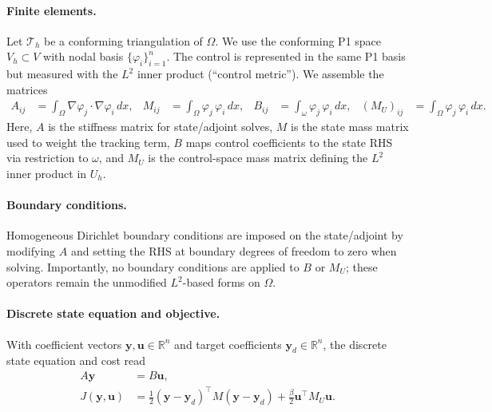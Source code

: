 \documentclass[11pt,a4paper]{article}
\begin{document}
\paragraph{Finite elements.} 
Let \(\mathcal{T}_h\) be a conforming triangulation of \(\Omega\). We use the conforming P1 space \(V_h\subset V\) with nodal basis \(\{\varphi_i\}_{i=1}^{n}\). The control is represented in the same P1 basis but measured with the \(L^2\) inner product (``control metric''). We assemble the matrices
\begin{align}
  A_{ij} &= \int_{\Omega} \nabla \varphi_j\cdot\nabla \varphi_i\, dx, &
  M_{ij} &= \int_{\Omega} \varphi_j\, \varphi_i\, dx, &
  B_{ij} &= \int_{\omega} \varphi_j\, \varphi_i\, dx, &
  (M_U)_{ij} &= \int_{\Omega} \varphi_j\, \varphi_i\, dx.
\end{align}
Here, \(A\) is the stiffness matrix for state/adjoint solves, \(M\) is the state mass matrix used to weight the tracking term, $B$ maps control coefficients to the state RHS via restriction to \(\omega\), and $M_U$ is the control-space mass matrix defining the \(L^2\) inner product in \(U_h\).

\paragraph{Boundary conditions.} 
Homogeneous Dirichlet boundary conditions are imposed on the state/adjoint by modifying \(A\) and setting the RHS at boundary degrees of freedom to zero when solving. Importantly, no boundary conditions are applied to \(B\) or $M_U$; these operators remain the unmodified \(L^2\)-based forms on \(\Omega\).

\paragraph{Discrete state equation and objective.} 
With coefficient vectors \(\mathbf{y},\mathbf{u}\in\mathbb{R}^n\) and target coefficients \(\mathbf{y}_d\in\mathbb{R}^n\), the discrete state equation and cost read
\begin{align}
  A\mathbf{y} &= B\mathbf{u}, \\
  J(\mathbf{y},\mathbf{u}) &= \tfrac12 (\mathbf{y}-\mathbf{y}_d)^\top M (\mathbf{y}-\mathbf{y}_d) + \tfrac{\beta}{2} \mathbf{u}^\top M_U\mathbf{u}.
\end{align}

\iffalse
\end{document}
